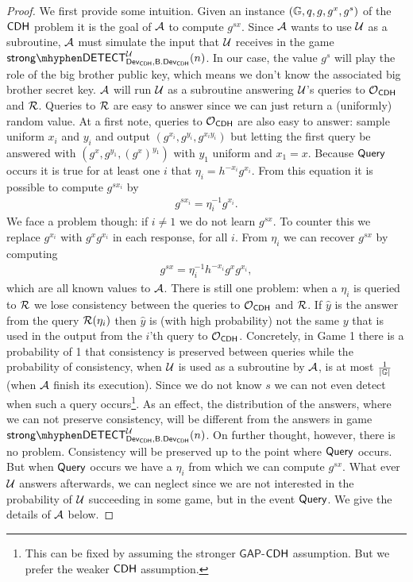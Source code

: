 \begin{proof}
We first provide some intuition. Given an instance $(\mathbb{G},q,g,g^x,g^s)$ of the $\mathsf{CDH}$ problem it is the goal of $\mathcal{A}$ to compute $g^{sx}$. Since $\mathcal{A}$ wants to use $\mathcal{U}$ as a subroutine, $\mathcal{A}$ must simulate the input that $\mathcal{U}$ receives in the game $\strongdetect{\dev_{\CDH}}{\bbdev_{\CDH}}{\user}$. In our case, the value $g^{s}$ will play the role of the big brother public key, which means we don't know the associated big brother secret key. $\mathcal{A}$ will run $\mathcal{U}$ as a subroutine answering $\mathcal{U}$'s queries to $\operatorname{\mathcal{O}}_{\mathsf{CDH}}$ and $\operatorname{\mathcal{R}}$. Queries to $\operatorname{\mathcal{R}}$ are easy to answer since we can just return a (uniformly) random value. At a first note, queries to $\operatorname{\mathcal{O}}_{\mathsf{CDH}}$ are also easy to answer: sample uniform $x_i$ and $y_i$ and output $(g^{x_i},g^{y_i},g^{x_iy_i})$ but letting the first query be answered with $(g^x,g^{y_1},(g^x)^{y_1})$ with $y_1$ uniform and $x_1 = x$. Because $\mathsf{Query}$ occurs it is true for at least one $i$ that $\eta_i = h^{-x_i}g^{x_i}$. From this equation it is possible to compute $g^{sx_i}$ by
\begin{align*}
	g^{sx_i} = \eta_i^{-1}g^{x_i}.
\end{align*}
We face a problem though: if $i\neq 1$ we do not learn $g^{sx}$. To counter this we replace $g^{x_i}$ with $g^xg^{x_i}$ in each response, for all $i$. From $\eta_i$ we can recover $g^{sx}$ by computing
\begin{align*}
	g^{sx} = \eta_i^{-1}h^{-x_i}g^xg^{x_i},
\end{align*}
which are all known values to $\mathcal{A}$. There is still one problem: when a $\eta_i$ is queried to $\operatorname{\mathcal{R}}$ we lose consistency between the queries to $\operatorname{\mathcal{O}}_{\mathsf{CDH}}$ and $\operatorname{\mathcal{R}}$. If $\hat{y}$ is the answer from the query $\operatorname{\mathcal{R}}(\eta_i)$ then $\hat{y}$ is (with high probability) not the same $y$ that is used in the output from the $i$'th query to $\operatorname{\mathcal{O}}_{\mathsf{CDH}}$. Concretely, in Game 1 there is a probability of 1 that consistency is preserved between queries while the probability of consistency, when $\mathcal{U}$ is used as a subroutine by $\mathcal{A}$, is at most $\frac{1}{\vert\mathbb{G}\vert}$ (when $\mathcal{A}$ finish its execution). Since we do not know $s$ we can not even detect when such a query occurs\footnote{This can be fixed by assuming the stronger $\mathsf{GAP}$-$\mathsf{CDH}$ assumption. But we prefer the weaker $\mathsf{CDH}$ assumption.}. As an effect, the distribution of the answers, where we can not preserve consistency, will be different from the answers in game $\strongdetect{\dev_{\CDH}}{\bbdev_{\CDH}}{\user}$. On further thought, however, there is no problem. Consistency will be preserved up to the point where $\mathsf{Query}$ occurs. But when $\mathsf{Query}$ occurs we have a $\eta_i$ from which we can compute $g^{sx}$. What ever $\mathcal{U}$ answers afterwards, we can neglect since we are not interested in the probability of $\mathcal{U}$ succeeding in some game, but in the event $\mathsf{Query}$. We give the details of $\mathcal{A}$ below.


\end{proof}
